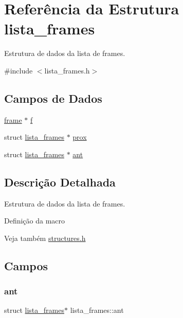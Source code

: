 \hypertarget{structlista__frames}{}\section{Referência da Estrutura lista\+\_\+frames}
\label{structlista__frames}


Estrutura de dados da lista de frames.  




{\ttfamily \#include $<$lista\+\_\+frames.\+h$>$}

\subsection*{Campos de Dados}
\begin{DoxyCompactItemize}
\item 
\hyperlink{structframe}{frame} $\ast$ \hyperlink{structlista__frames_ad7777179f480ab04a686cf8edf19addf}{f}
\item 
struct \hyperlink{structlista__frames}{lista\+\_\+frames} $\ast$ \hyperlink{structlista__frames_ac33c75b9e66a517b493e6d35a3c1efb3}{prox}
\item 
struct \hyperlink{structlista__frames}{lista\+\_\+frames} $\ast$ \hyperlink{structlista__frames_ac0c434c06689eb8f4a43e9affaa70be5}{ant}
\end{DoxyCompactItemize}


\subsection{Descrição Detalhada}
Estrutura de dados da lista de frames. 

Definição da macro

\begin{DoxySeeAlso}{Veja também}
\hyperlink{structures_8h}{structures.\+h} 
\end{DoxySeeAlso}


\subsection{Campos}
\mbox{\label{structlista__frames_ac0c434c06689eb8f4a43e9affaa70be5}} 
\subsubsection{\texorpdfstring{ant}{ant}}
{\footnotesize\ttfamily struct \hyperlink{structlista__frames}{lista\+\_\+frames}$\ast$ lista\+\_\+frames\+::ant}

